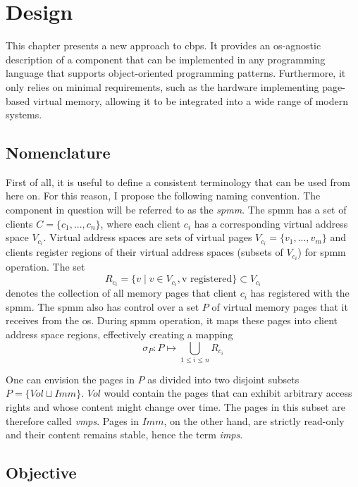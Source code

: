 \chapter{Design}
\label{chap:design}

This chapter presents a new approach to \ac{cbps}.
It provides an \ac{os}-agnostic description of a component that can be implemented in any programming language that supports object-oriented programming patterns.
Furthermore, it only relies on minimal requirements, such as the hardware implementing page-based virtual memory, allowing it to be integrated into a wide range of modern systems.

\section{Nomenclature}
\label{sec:nomenclature}

First of all, it is useful to define a consistent terminology that can be used from here on.
For this reason, I propose the following naming convention.
The component in question will be referred to as the \textit{\acf{spmm}}.
The \ac{spmm} has a set of clients $C = \{c_1,...,c_n\}$, where each client $c_i$ has a corresponding virtual address space $V_{c_i}$.
Virtual address spaces are sets of virtual pages $V_{c_i} = \{v_1,...,v_m\}$ and clients register regions of their virtual address spaces (subsets of $V_{c_i}$) for \ac{spmm} operation.
The set $$R_{c_i} = \{ v \mid v \in V_{c_i}, \text{v registered}\} \subset V_{c_i}$$ denotes the collection of all memory pages that client $c_i$ has registered with the \ac{spmm}.
The \ac{spmm} also has control over a set $P$ of virtual memory pages that it receives from the \ac{os}.
During \ac{spmm} operation, it maps these pages into client address space regions, effectively creating a mapping $$\sigma_{P}: P \mapsto \bigcup_{1 \leq i \leq n} R_{c_i}$$

One can envision the pages in $P$ as divided into two disjoint subsets $P = \{Vol \sqcup Imm\}$.
$Vol$ would contain the pages that can exhibit arbitrary access rights and whose content might change over time.
The pages in this subset are therefore called \textit{\acfp{vmp}}.
Pages in $Imm$, on the other hand, are strictly read-only and their content remains stable, hence the term \textit{\acfp{imp}}.

\section{Objective}
\label{sec:objective}

